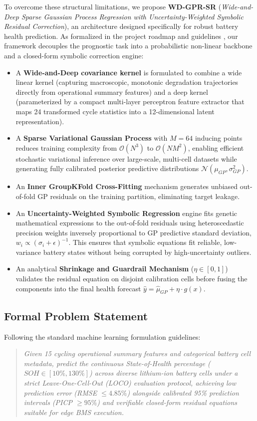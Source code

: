 \documentclass[a4paper,fleqn]{cas-sc}
\begin{document}
To overcome these structural limitations, we propose \textbf{WD-GPR-SR} (\textit{Wide-and-Deep Sparse Gaussian Process Regression with Uncertainty-Weighted Symbolic Residual Correction}), an architecture designed specifically for robust battery health prediction. As formalized in the project roadmap and guidelines \cite{hu2026multiphysics, cranmer2023pysr, titsias2009variational}, our framework decouples the prognostic task into a probabilistic non-linear backbone and a closed-form symbolic correction engine:
\begin{itemize}
    \item A \textbf{Wide-and-Deep covariance kernel} is formulated to combine a wide linear kernel (capturing macroscopic, monotonic degradation trajectories directly from operational summary features) and a deep kernel (parameterized by a compact multi-layer perceptron feature extractor that maps 24 transformed cycle statistics into a 12-dimensional latent representation).
    \item A \textbf{Sparse Variational Gaussian Process} with $M=64$ inducing points \cite{titsias2009variational} reduces training complexity from $\mathcal{O}(N^3)$ to $\mathcal{O}(NM^2)$, enabling efficient stochastic variational inference over large-scale, multi-cell datasets while generating fully calibrated posterior predictive distributions $\mathcal{N}(\mu_{GP}, \sigma_{GP}^2)$.
    \item An \textbf{Inner GroupKFold Cross-Fitting} mechanism generates unbiased out-of-fold GP residuals on the training partition, eliminating target leakage.
    \item An \textbf{Uncertainty-Weighted Symbolic Regression} engine fits genetic mathematical expressions to the out-of-fold residuals using heteroscedastic precision weights inversely proportional to GP predictive standard deviation, $w_i \propto (\sigma_i + \epsilon)^{-1}$. This ensures that symbolic equations fit reliable, low-variance battery states without being corrupted by high-uncertainty outliers.
    \item An analytical \textbf{Shrinkage and Guardrail Mechanism} ($\eta \in [0, 1]$) validates the residual equation on disjoint calibration cells before fusing the components into the final health forecast $\hat{y} = \hat{\mu}_{GP} + \eta \cdot g(x)$.
\end{itemize}

\subsection{Formal Problem Statement}
Following the standard machine learning formulation guidelines:
\begin{quote}
\textit{Given 15 cycling operational summary features and categorical battery cell metadata, predict the continuous State-of-Health percentage ($SOH \in [10\%, 130\%]$) across diverse lithium-ion battery cells under a strict Leave-One-Cell-Out (LOCO) evaluation protocol, achieving low prediction error (RMSE $\le 4.85\%$) alongside calibrated 95\% prediction intervals (PICP $\ge 95\%$) and verifiable closed-form residual equations suitable for edge BMS execution.}
\end{quote}
\end{document}
